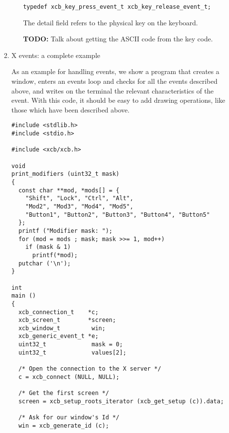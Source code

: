 \documentclass[12pt,oneside,titlepage]{book}
\begin{document}
\begin{enumerate}
\begin{enumerate}
\begin{enumerate}
\begin{verbatim}
typedef xcb_key_press_event_t xcb_key_release_event_t;
\end{verbatim}

      The {detail} field refers to the physical key on the keyboard.

      \textbf{TODO:} Talk about getting the ASCII code from the key
      code.
    \end{enumerate}
  \item
    \protect\hypertarget{eventex}{}{X events: a complete example}

    As an example for handling events, we show a program that creates a
    window, enters an events loop and checks for all the events
    described above, and writes on the terminal the relevant
    characteristics of the event. With this code, it should be easy to
    add drawing operations, like those which have been described above.

\begin{verbatim}
#include <stdlib.h>
#include <stdio.h>

#include <xcb/xcb.h>

void
print_modifiers (uint32_t mask)
{
  const char **mod, *mods[] = {
    "Shift", "Lock", "Ctrl", "Alt",
    "Mod2", "Mod3", "Mod4", "Mod5",
    "Button1", "Button2", "Button3", "Button4", "Button5"
  };
  printf ("Modifier mask: ");
  for (mod = mods ; mask; mask >>= 1, mod++)
    if (mask & 1)
      printf(*mod);
  putchar ('\n');
}

int
main ()
{
  xcb_connection_t    *c;
  xcb_screen_t        *screen;
  xcb_window_t         win;
  xcb_generic_event_t *e;
  uint32_t             mask = 0;
  uint32_t             values[2];

  /* Open the connection to the X server */
  c = xcb_connect (NULL, NULL);

  /* Get the first screen */
  screen = xcb_setup_roots_iterator (xcb_get_setup (c)).data;

  /* Ask for our window's Id */
  win = xcb_generate_id (c);


\end{verbatim}
\end{enumerate}
\end{enumerate}
\end{document}
